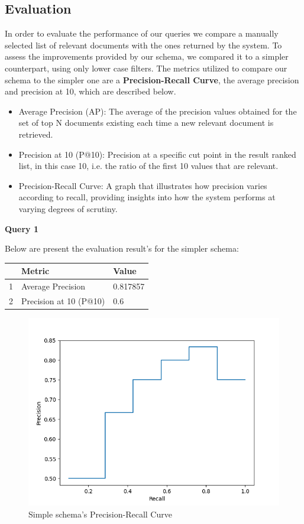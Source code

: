 \subsection{Evaluation}

In order to evaluate the performance of our queries we compare a manually selected list of relevant documents with the ones returned by the system. To assess the improvements provided by our schema, we compared it to a simpler counterpart, using only lower case filters. The metrics utilized to compare our schema to the simpler one are a \textbf{Precision-Recall Curve}, the average precision and precision at 10, which are described below.


\begin{itemize}
    \item Average Precision (AP): The average of the precision values obtained for the set of top N documents existing each time a new relevant document is retrieved.
    \item Precision at 10 (P@10): Precision at a specific cut point in the result ranked list, in this case 10, i.e. the ratio of the first 10 values that are relevant.
    \item Precision-Recall Curve: A graph that illustrates how precision varies according to recall, providing insights into how the system performs at varying degrees of scrutiny.

\end{itemize}

\textbf{Query 1}

Below are present the evaluation result's for the simpler schema:

\begin{center}
\begin{tabular}{lll}
\toprule
 &                  Metric &    Value \\
\midrule
1 &       Average Precision &  0.817857 \\
2 &  Precision at 10 (P@10) &      0.6 \\
\bottomrule
\end{tabular}
\end{center}

\begin{figure}[H]
    \centering
    \includegraphics[width=0.6\linewidth]{figures/toxic_simple.png}
    \caption{Simple schema's Precision-Recall Curve}
\end{figure}

